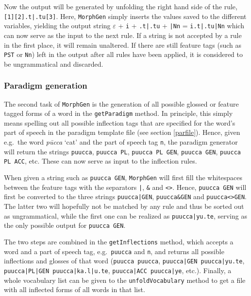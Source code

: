 \documentclass[a4paper]{article}
\newcommand{\typ}[1]{\texttt{#1}}
\begin{document}
Now the output will be generated by unfolding the right hand side of the rule, \typ{[1][2].t|.tu[3]}. Here, \typ{MorphGen} simply inserts the values saved to the different variables, yielding the output string $\varepsilon$ + \typ{i} + \typ{.t|.tu} + \typ{|Nn} = \typ{i.t|.tu|Nn} which can now serve as the input to the next rule. If a string is not accepted by a rule in the first place, it will remain unaltered. If there are still feature tags (such as \typ{PST} or \typ{Nn}) left in the output after all rules have been applied, it is considered to be ungrammatical and discarded.

\subsubsection{Paradigm generation}\label{pargen}

The second task of \typ{MorphGen} is the generation of all possible glossed or feature tagged forms of a word in the \typ{getParadigm} method. In principle, this simply means spelling out all possible inflection tags that are specified for the word's part of speech in the paradigm template file (see section \ref{parfile}). Hence, given e.g.\ the word \textit{pūcca} `cat' and the part of speech tag \typ{n}, the paradigm generator will return the strings \typ{puucca}, \typ{puucca PL}, \typ{puucca PL GEN}, \typ{puucca GEN}, \typ{puucca PL ACC}, etc. These can now serve as input to the inflection rules.

When given a string such as \typ{puucca GEN}, \typ{MorphGen} will first fill the whitespaces between the feature tags with the separators \typ{|}, \typ{\&} and \typ{<>}. Hence, \typ{puucca GEN} will first be converted to the three strings \typ{puucca|GEN}, \typ{puucca\&GEN} and \typ{puucca<>GEN}. The latter two will hopefully not be matched by any rule and thus be sorted out as ungrammatical, while the first one can be realized as \typ{puucca|yu.te}, serving as the only possible output for \typ{puucca GEN}.

The two steps are combined in the \typ{getInflections} method, which accepts a word and a part of speech tag, e.g.\ \typ{puucca} and \typ{n}, and returns all possible inflections and glosses of that word (\typ{puucca puucca}, \typ{puucca|GEN puucca|yu.te}, \typ{puucca|PL|GEN puucca|ka.l|u.te}, \typ{puucca|ACC puucca|ye}, etc.). Finally, a whole vocabulary list can be given to the \typ{unfoldVocabulary} method to get a file with all inflected forms of all words in that list.
\end{document}
